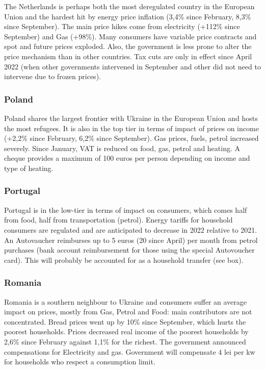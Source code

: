 \documentclass[
  9pt,
  a4paper,
  DIV=11,
  numbers=noendperiod,
  oneside]{scrartcl}
\begin{document}
The Netherlands is perhaps both the most deregulated country in the
European Union and the hardest hit by energy price inflation (3,4\%
since February, 8,3\% since September). The main price hikes come from
electricity (+112\% since September) and Gas (+98\%). Many consumers
have variable price contracts and spot and future prices exploded. Also,
the government is less prone to alter the price mechanism than in other
countries. Tax cuts are only in effect since April 2022 (when other
governments intervened in September and other did not need to intervene
due to frozen prices).

\hypertarget{poland}{%
\subsubsection{Poland}\label{poland}}

Poland shares the largest frontier with Ukraine in the European Union
and hosts the most refugees. It is also in the top tier in terms of
impact of prices on income (+2,2\% since February, 6,2\% since
September). Gas prices, fuels, petrol increased severely. Since January,
VAT is reduced on food, gas, petrol and heating. A cheque provides a
maximum of 100 euros per person depending on income and type of heating.

\hypertarget{portugal}{%
\subsubsection{Portugal}\label{portugal}}

Portugal is in the low-tier in terms of impact on consumers, which comes
half from food, half from transportation (petrol). Energy tariffs for
household consumers are regulated and are anticipated to decrease in
2022 relative to 2021. An Autovaucher reimburses up to 5 euros (20 since
April) per month from petrol purchases (bank account reimbursement for
those using the special Autovoucher card). This will probably be
accounted for as a household transfer (see box).

\hypertarget{romania}{%
\subsubsection{Romania}\label{romania}}

Romania is a southern neighbour to Ukraine and consumers suffer an
average impact on prices, mostly from Gas, Petrol and Food: main
contributors are not concentrated. Bread prices went up by 10\% since
September, which hurts the poorest households. Prices decreased real
income of the poorest households by 2,6\% since February against 1,1\%
for the richest. The government announced compensations for Electricity
and gas. Government will compensate 4 lei per kw for households who
respect a consumption limit.
\end{document}
